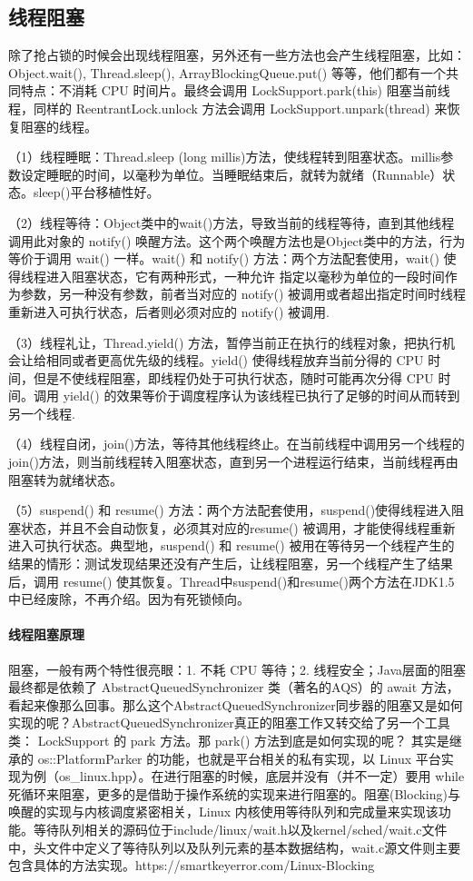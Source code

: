 \documentclass[../../../interview-questions.tex]{subfiles}
\begin{document}
\subsection{线程阻塞}

除了抢占锁的时候会出现线程阻塞，另外还有一些方法也会产生线程阻塞，比如： Object.wait(), Thread.sleep(), ArrayBlockingQueue.put() 等等，他们都有一个共同特点：不消耗 CPU 时间片。最终会调用 LockSupport.park(this) 阻塞当前线程，同样的 ReentrantLock.unlock 方法会调用 LockSupport.unpark(thread) 来恢复阻塞的线程。

（1）线程睡眠：Thread.sleep (long millis)方法，使线程转到阻塞状态。millis参数设定睡眠的时间，以毫秒为单位。当睡眠结束后，就转为就绪（Runnable）状态。sleep()平台移植性好。

（2）线程等待：Object类中的wait()方法，导致当前的线程等待，直到其他线程调用此对象的 notify() 唤醒方法。这个两个唤醒方法也是Object类中的方法，行为等价于调用 wait() 一样。wait() 和 notify() 方法：两个方法配套使用，wait() 使得线程进入阻塞状态，它有两种形式，一种允许 指定以毫秒为单位的一段时间作为参数，另一种没有参数，前者当对应的 notify() 被调用或者超出指定时间时线程重新进入可执行状态，后者则必须对应的 notify() 被调用.

（3）线程礼让，Thread.yield() 方法，暂停当前正在执行的线程对象，把执行机会让给相同或者更高优先级的线程。yield() 使得线程放弃当前分得的 CPU 时间，但是不使线程阻塞，即线程仍处于可执行状态，随时可能再次分得 CPU 时间。调用 yield() 的效果等价于调度程序认为该线程已执行了足够的时间从而转到另一个线程.

（4）线程自闭，join()方法，等待其他线程终止。在当前线程中调用另一个线程的join()方法，则当前线程转入阻塞状态，直到另一个进程运行结束，当前线程再由阻塞转为就绪状态。

（5）suspend() 和 resume() 方法：两个方法配套使用，suspend()使得线程进入阻塞状态，并且不会自动恢复，必须其对应的resume() 被调用，才能使得线程重新进入可执行状态。典型地，suspend() 和 resume() 被用在等待另一个线程产生的结果的情形：测试发现结果还没有产生后，让线程阻塞，另一个线程产生了结果后，调用 resume() 使其恢复。Thread中suspend()和resume()两个方法在JDK1.5中已经废除，不再介绍。因为有死锁倾向。

\paragraph{线程阻塞原理}

阻塞，一般有两个特性很亮眼：1. 不耗 CPU 等待；2. 线程安全；Java层面的阻塞最终都是依赖了 AbstractQueuedSynchronizer 类（著名的AQS）的 await 方法，看起来像那么回事。那么这个AbstractQueuedSynchronizer同步器的阻塞又是如何实现的呢？AbstractQueuedSynchronizer真正的阻塞工作又转交给了另一个工具类： LockSupport 的 park 方法。那 park() 方法到底是如何实现的呢？ 其实是继承的 os::PlatformParker 的功能，也就是平台相关的私有实现，以 Linux 平台实现为例（os\_linux.hpp）。在进行阻塞的时候，底层并没有（并不一定）要用 while 死循环来阻塞，更多的是借助于操作系统的实现来进行阻塞的。阻塞(Blocking)与唤醒的实现与内核调度紧密相关，Linux 内核使用等待队列和完成量来实现该功能。等待队列相关的源码位于include/linux/wait.h以及kernel/sched/wait.c文件中，头文件中定义了等待队列以及队列元素的基本数据结构，wait.c源文件则主要包含具体的方法实现。https://smartkeyerror.com/Linux-Blocking
\end{document}
